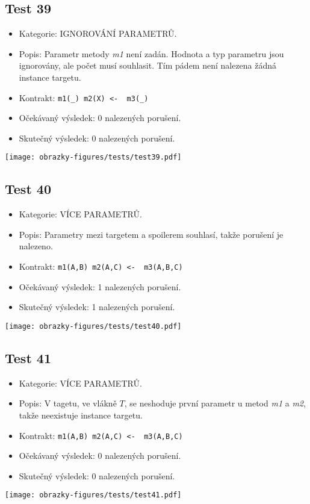 \subsection*{Test 39}
\begin{itemize}
\item Kategorie: IGNOROVÁNÍ PARAMETRŮ.
\item Popis: Parametr metody \textit{m1} není zadán. Hodnota a typ parametru jsou ignorovány, ale počet musí souhlasit. Tím pádem není nalezena žádná instance targetu. 
\item Kontrakt: \texttt{m1(_) m2(X) <- { m3(_) }}
\item Očekávaný výsledek: 0 nalezených porušení.

\item Skutečný výsledek: 0 nalezených porušení.
\end{itemize}
\begin{center}
    \centering
    \texttt{[image: obrazky-figures/tests/test39.pdf]}
    \label{test39}
\end{center}
\subsection*{Test 40}
\begin{itemize}
\item Kategorie: VÍCE PARAMETRŮ.
\item Popis: Parametry mezi targetem a spoilerem souhlasí, takže porušení je nalezeno. 
\item Kontrakt: \texttt{m1(A,B) m2(A,C) <- { m3(A,B,C) }}
\item Očekávaný výsledek: 1 nalezených porušení.
\item Skutečný výsledek: 1 nalezených porušení.

\end{itemize}
\begin{center}
    \centering
    \texttt{[image: obrazky-figures/tests/test40.pdf]}
    \label{test40}
\end{center}
\subsection*{Test 41}
\begin{itemize}
\item Kategorie: VÍCE PARAMETRŮ.
\item Popis: V tagetu, ve vlákně $T$, se neshoduje první parametr u metod \textit{m1} a \textit{m2}, takže neexistuje instance targetu. 
\item Kontrakt: \texttt{m1(A,B) m2(A,C) <- { m3(A,B,C) }}
\item Očekávaný výsledek: 0 nalezených porušení.

\item Skutečný výsledek: 0 nalezených porušení.
\end{itemize}
\begin{center}
    \centering
    \texttt{[image: obrazky-figures/tests/test41.pdf]}
    \label{test41}
\end{center}
